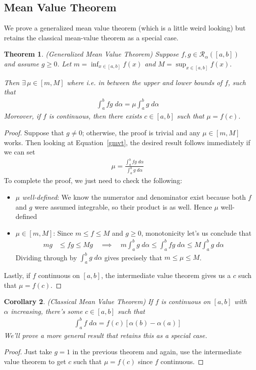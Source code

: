 \documentclass[12pt]{article}
\numberwithin{equation}{section} %
\theoremstyle{plain}
\newtheorem{thm}{Theorem}[section]
\newtheorem{cor}[thm]{Corollary}
\theoremstyle{definition}
\theoremstyle{remark}
\begin{document}
\newpage
\subsection{Mean Value Theorem}

We prove a generalized mean value theorem (which is a little weird
looking) but retains the classical mean-value theorem as a special case.

\begin{thm}\emph{(Generalized Mean Value Theorem)}
\label{mvt}
Suppose $f,g\in\mathscr{R}_\alpha([a,b])$ and assume $g\geq0$.
Let $m=\inf_{x\in[a,b]} f(x)$ and $M=\sup_{x\in[a,b]} f(x)$.

Then $\exists\,\mu\in[m,M]$ where i.e. in between the upper and lower
bounds of $f$, such that
\begin{align}
  \int^b_a fg\;d\alpha = \mu \int^b_a g\;d\alpha
  \label{gmvt}
\end{align}
Moreover, if $f$ is continuous, then there exists $c\in[a,b]$ such that
$\mu = f(c)$.
\end{thm}
\begin{proof}
Suppose that $g\neq 0$; otherwise, the proof is trivial and
any $\mu\in[m,M]$ works.
Then looking at Equation~\ref{gmvt}, the desired result follows
immediately if we can set
\begin{align*}
  \mu = \frac{\int^b_a fg\;d\alpha}{\int^b_a g\;d\alpha}
\end{align*}
To complete the proof, we just need to check the following:
\begin{itemize}
  \item
    \emph{$\mu$ well-defined}: We know the numerator and denominator
    exist because both $f$ and $g$ were assumed integrable, so their
    product is as well. Hence $\mu$ well-defined
  \item $\mu\in[m,M]$:
    Since $m\leq f \leq M$ and $g\geq0$, monotonicity let's us conclude
    that
    \begin{align}
      mg &\leq fg \leq Mg
      \quad\implies\quad
      m\int^b_a g\;d\alpha \leq
      \int^b_a fg\;d\alpha \leq  M \int^b_a g\;d\alpha
      \label{gmvtineq}
    \end{align}
    Dividing through by $\int^b_a g\;d\alpha$ gives precisely that
    $m\leq \mu\leq M$.
\end{itemize}
Lastly, if $f$ continuous on $[a,b]$, the intermediate value theorem
gives us a $c$ such that $\mu=f(c)$.
\end{proof}

\begin{cor}\emph{(Classical Mean Value Theorem)}
If $f$ is continuous on $[a,b]$ with $\alpha$ increasing, there's some
$c\in[a,b]$ such that
\begin{align*}
  \int^b_a f\;d\alpha = f(c)[\alpha(b)-\alpha(a)]
\end{align*}
We'll prove a more general result that retains this as a special case.
\end{cor}
\begin{proof}
Just take $g=1$ in the previous theorem and again, use the intermediate
value theorem to get $c$ such that $\mu=f(c)$ since $f$ continuous.
\end{proof}
\end{document}
